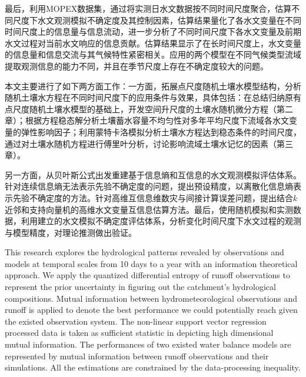 最后，利用MOPEX数据集，通过将实测日水文数据按不同时间尺度聚合，估算不同尺度下水文观测模拟不确定度及其控制因素，估算结果量化了各水文变量在不同时间尺度上的信息量与信息流动，进一步分析了不同时间尺度下各水文变量及前期水文过程对当前水文响应的信息贡献。估算结果显示了在长时间尺度上，水文变量的信息量和信息交流与其气候特性紧密相关。应用的两个模型在不同气候类型流域提取观测信息的能力不同，并且在季节尺度上存在不确定度较大的问题。

















\iffalse
本文主要进行了如下两方面工作：一方面，拓展点尺度随机土壤水模型结构，分析随机土壤水方程在不同时间尺度下的应用条件与效果，具体包括：在总结归纳原有点尺度随机土壤水模型的基础上，开发空间升尺度的土壤水随机微分方程（第二章）；根据方程稳态解分析土壤蓄水容量不均匀性对多年平均尺度下流域各水文变量的弹性影响因子；利用蒙特卡洛模拟分析土壤水方程达到稳态条件的时间尺度，通过对土壤水随机方程进行傅里叶分析，讨论影响流域土壤水记忆的因素（第三章）。

另一方面，从贝叶斯公式出发重建基于信息熵和互信息的水文观测模拟评估体系。针对连续信息熵无法表示先验不确定度的问题，提出预设精度，以离散化信息熵表示先验不确定度的方法。针对高维互信息维数灾与间接计算误差问题，提出结合$k$近邻和支持向量机的高维水文变量互信息估算方法。最后，使用随机模拟和实测数据，利用建立的水文模拟不确定度评估体系，分析变化时间尺度下水文过程的观测与模型精度，对理论推测做出验证。



This research explores the hydrological patterns revealed by observations and models at temporal scales from 10 days to a year with an information theoretical approach. We apply the quantized differential entropy of runoff observations to represent the prior uncertainty in figuring out the catchment's hydrological compositions. Mutual information between hydrometeorological observations and runoff is applied to denote the best performance we could potentially reach given the existed observation system. The non-linear support vector regression processed data is taken as sufficient statistic in depicting  high dimensional mutual information.
The performances of two existed water balance models are represented by mutual information between runoff observations and their simulations. All the estimations are constrained by the  data-processing inequality. 

